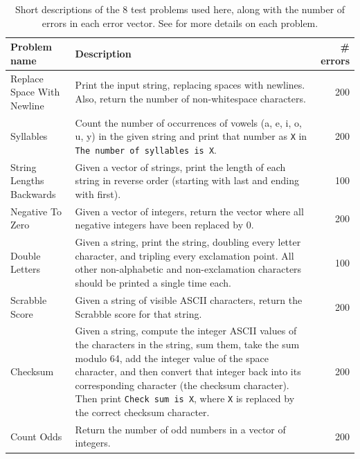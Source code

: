 \begin{table}
\centering
	\caption{Short descriptions of the 8 test problems used here, along with the number of errors in each error vector. See \cite{Helmuth:2015:GECCO} for more details on each problem.}
	\label{tab:problems}
	\begin{tabular}{lp{7.0cm}r}
		Problem name \quad & Description \quad & \# errors \\
		\hline
		Replace Space With Newline & Print the input string, replacing spaces with newlines. Also, return the number of non-whitespace characters. & 200 \\
		Syllables & Count the number of occurrences of vowels (a, e, i, o, u, y) in the given string and print that number as \texttt{X} in \texttt{The number of syllables is X}. & 200 \\
		String Lengths Backwards & Given a vector of strings, print the length of each string in reverse order (starting with last and ending with first). & 100 \\
		Negative To Zero & Given a vector of integers, return the vector where all negative integers have been replaced by 0. & 200 \\
		Double Letters & Given a string, print the string, doubling every letter character, and tripling every exclamation point. All other non-alphabetic and non-exclamation characters should be printed a single time each. & 100 \\
		Scrabble Score & Given a string of visible ASCII characters, return the Scrabble score for that string. & 200 \\
		Checksum & Given a string, compute the integer ASCII values of the characters in the string, sum them, take the sum modulo 64, add the integer value of the space character, and then convert that integer back into its corresponding character (the checksum character). Then print \texttt{Check sum is X}, where \texttt{X} is replaced by the correct checksum character. & 200 \\
		Count Odds & Return the number of odd numbers in a vector of integers. & 200
	\end{tabular}
\end{table}


